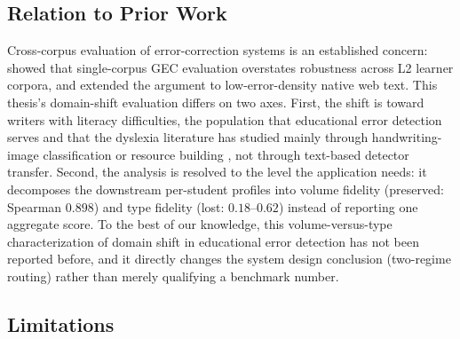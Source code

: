 \subsection{Relation to Prior Work}
\label{sec:eval_discuss_prior}

Cross-corpus evaluation of error-correction systems is an established concern: \textcite{Mita2019CrossCorpora} showed that single-corpus GEC evaluation overstates robustness across L2 learner corpora, and \textcite{Flachs2020CWEB} extended the argument to low-error-density native web text. This thesis's domain-shift evaluation differs on two axes. First, the shift is toward writers with literacy difficulties, the population that educational error detection serves and that the dyslexia literature has studied mainly through handwriting-image classification or resource building \parencite{RelloBaezaYates2014}, not through text-based detector transfer. Second, the analysis is resolved to the level the application needs: it decomposes the downstream per-student profiles into volume fidelity (preserved: Spearman $0.898$) and type fidelity (lost: $0.18$--$0.62$) instead of reporting one aggregate score. To the best of our knowledge, this volume-versus-type characterization of domain shift in educational error detection has not been reported before, and it directly changes the system design conclusion (two-regime routing) rather than merely qualifying a benchmark number.

\subsection{Limitations}
\label{sec:eval_discuss_limit}

